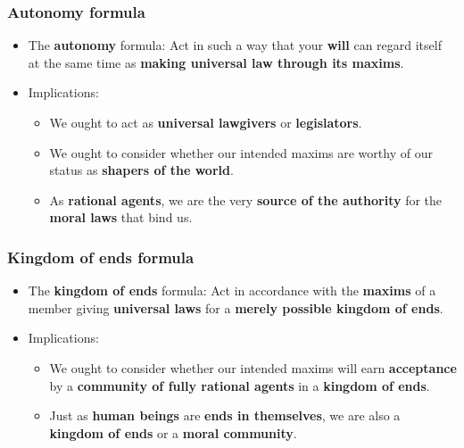 \documentclass[11pt]{article}
\begin{document}
\subsubsection{Autonomy formula}
\label{sec:orgfc82b33}
\begin{itemize}
\item The \textbf{autonomy} formula:
Act in such a way that your \textbf{will} can regard itself at the same time as \textbf{making universal law through its maxims}.
\item Implications:
\begin{itemize}
\item We ought to act as \textbf{universal lawgivers} or \textbf{legislators}.
\item We ought to consider whether our intended maxims are worthy of our status as \textbf{shapers of the world}.
\item As \textbf{rational agents}, we are the very \textbf{source of the authority} for the \textbf{moral laws} that bind us.
\end{itemize}
\end{itemize}
\subsubsection{Kingdom of ends formula}
\label{sec:orgbb2ebe7}
\begin{itemize}
\item The \textbf{kingdom of ends} formula:
Act in accordance with the \textbf{maxims} of a member giving \textbf{universal laws} for a \textbf{merely possible kingdom of ends}.
\item Implications:
\begin{itemize}
\item We ought to consider whether our intended maxims will earn \textbf{acceptance} by a \textbf{community of fully rational agents} in a \textbf{kingdom of ends}.
\item Just as \textbf{human beings} are \textbf{ends in themselves}, we are also a \textbf{kingdom of ends} or a \textbf{moral community}.
\end{itemize}
\end{itemize}

 \newpage
\end{document}
